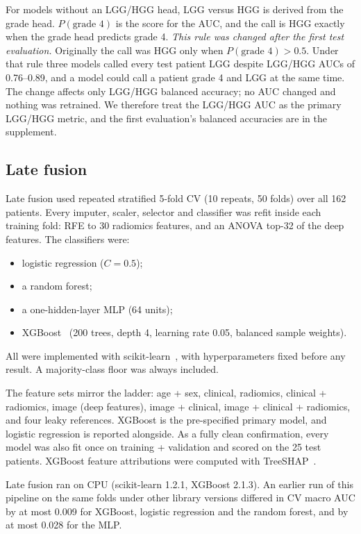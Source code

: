 \documentclass[11pt]{article}
\begin{document}
For models without an LGG/HGG head, LGG versus HGG is derived from the grade head. $P(\text{grade 4})$ is the score
for the AUC, and the call is HGG exactly when the grade head predicts grade 4. \emph{This rule was changed after the
first test evaluation.} Originally the call was HGG only when $P(\text{grade 4}) > 0.5$. Under that rule three models
called every test patient LGG despite LGG/HGG AUCs of 0.76--0.89, and a model could call a patient grade 4 and LGG at
the same time. The change affects only LGG/HGG balanced accuracy; no AUC changed and nothing was retrained. We
therefore treat the LGG/HGG AUC as the primary LGG/HGG metric, and the first evaluation's balanced accuracies are in
the supplement.

\subsection{Late fusion}
Late fusion used repeated stratified 5-fold CV (10 repeats, 50 folds) over all 162 patients. Every imputer, scaler,
selector and classifier was refit inside each training fold: RFE to 30 radiomics features, and an ANOVA top-32 of the
deep features. The classifiers were:
\begin{itemize}
  \item logistic regression ($C = 0.5$);
  \item a random forest;
  \item a one-hidden-layer MLP (64 units);
  \item XGBoost~\cite{chen2016xgboost} (200 trees, depth 4, learning rate 0.05, balanced sample weights).
\end{itemize}
All were implemented with scikit-learn~\cite{pedregosa2011sklearn}, with hyperparameters fixed before any result. A
majority-class floor was always included.

The feature sets mirror the ladder: age + sex, clinical, radiomics, clinical + radiomics, image (deep features),
image + clinical, image + clinical + radiomics, and four leaky references. XGBoost is the pre-specified primary model,
and logistic regression is reported alongside. As a fully clean confirmation, every model was also fit once on
training + validation and scored on the 25 test patients. XGBoost feature attributions were computed with
TreeSHAP~\cite{lundberg2017shap,lundberg2020tree}.

Late fusion ran on CPU (scikit-learn 1.2.1, XGBoost 2.1.3). An earlier run of this pipeline on the same folds under
other library versions differed in CV macro AUC by at most 0.009 for XGBoost, logistic regression and the random
forest, and by at most 0.028 for the MLP.
\end{document}
